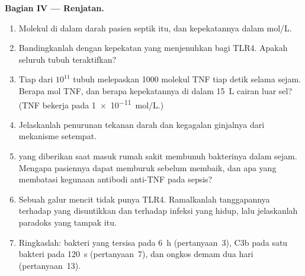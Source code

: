 \begin{problem}
\medskip
\noindent\textbf{Bagian IV --- Renjatan.}
\begin{enumerate}[resume]
  \item Molekul  di dalam darah pasien septik
        itu, dan kepekatannya dalam mol/L.
  \item Bandingkanlah dengan kepekatan yang menjenuhkan bagi TLR4. Apakah
        seluruh  tubuh teraktifkan?
  \item Tiap dari $10^{11}$  tubuh melepaskan \num{1000} molekul TNF
        tiap detik selama sejam. Berapa mol TNF, dan berapa
        kepekatannya di dalam \qty{15}{L} cairan luar sel? (TNF bekerja
        pada \qty{1e-11}{mol/L}.)
  \item Jelaskanlah penurunan tekanan darah dan kegagalan
        ginjalnya dari mekanisme  setempat.
  \item {} yang diberikan saat masuk rumah sakit membunuh bakterinya dalam
        sejam. Mengapa pasiennya dapat memburuk sebelum membaik, dan apa yang
        membatasi kegunaan antibodi anti-TNF pada sepsis?
  \item Sebuah galur mencit tidak punya TLR4. Ramalkanlah tanggapannya terhadap
         yang disuntikkan dan terhadap infeksi  yang hidup, lalu
        jelaskanlah paradoks yang tampak itu.
  \item Ringkaslah: bakteri yang tersisa pada \qty{6}{h} (pertanyaan~3),
        C3b pada satu bakteri pada \qty{120}{s} (pertanyaan~7), dan
        ongkos demam dua hari (pertanyaan~13).
\end{enumerate}
\end{problem}
